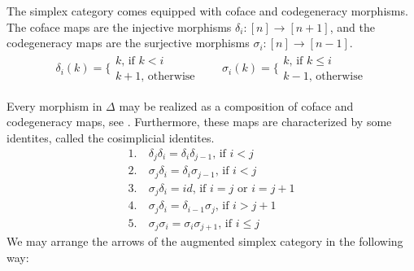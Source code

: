\documentclass[../thesis.tex]{subfiles}
\begin{document}
            The simplex category comes equipped with coface and codegeneracy morphisms. The coface maps are the injective morphisms $\delta_i : [n] \rightarrow [n+1]$, and the codegeneracy maps are the surjective morphisms $\sigma_i: [n] \rightarrow [n-1]$.
            \begin{align*}
                \delta_i(k) = \biggl\{\substack{k\text{, if }k<i \\ k+1\text{, otherwise}} \qquad
                \sigma_i(k) = \biggl\{\substack{k\text{, if }k\leq i \\ k-1\text{, otherwise}}
            \end{align*}

            Every morphism in $\Delta$ may be realized as a composition of coface and codegeneracy maps, see \cite{MacLane71}. Furthermore, these maps are characterized by some identites, called the cosimplicial identites. 
            \begin{align*}
                1.&\ \delta_j\delta_i = \delta_i\delta_{j-1} \text{, if }i<j \\
                2.&\ \sigma_j\delta_i = \delta_i\sigma_{j-1} \text{, if }i<j \\
                3.&\ \sigma_j\delta_i = id \text{, if }i=j\text{ or }i=j+1 \\
                4.&\ \sigma_j\delta_i = \delta_{i-1}\sigma_j \text{, if }i>j+1 \\
                5.&\ \sigma_j\sigma_i = \sigma_i\sigma_{j+1} \text{, if }i\leq j
            \end{align*}
            We may arrange the arrows of the augmented simplex category in the following way:
            \begin{center}

            \end{center}
\end{document}

